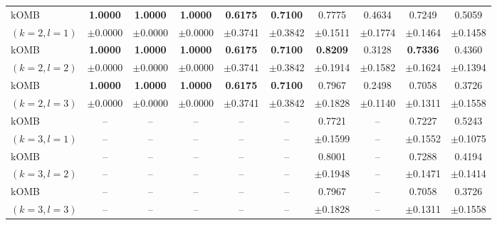 \begin{tabular}{lccccccccc}
kOMB
& \textbf{1.0000} & \textbf{1.0000} & \textbf{1.0000} & \textbf{0.6175} & \textbf{0.7100} & 0.7775 & 0.4634 & 0.7249 & 0.5059 \\
{\scriptsize $(k=2,l=1)$} & {\scriptsize $\pm$0.0000} & {\scriptsize $\pm$0.0000} & {\scriptsize $\pm$0.0000} & {\scriptsize $\pm$0.3741} & {\scriptsize $\pm$0.3842} & {\scriptsize $\pm$0.1511} & {\scriptsize $\pm$0.1774} & {\scriptsize $\pm$0.1464} & {\scriptsize $\pm$0.1458} \\

kOMB
& \textbf{1.0000} & \textbf{1.0000} & \textbf{1.0000} & \textbf{0.6175} & \textbf{0.7100} & \textbf{0.8209} & 0.3128 & \textbf{0.7336} & 0.4360 \\
{\scriptsize $(k=2,l=2)$} & {\scriptsize $\pm$0.0000} & {\scriptsize $\pm$0.0000} & {\scriptsize $\pm$0.0000} & {\scriptsize $\pm$0.3741} & {\scriptsize $\pm$0.3842} & {\scriptsize $\pm$0.1914} & {\scriptsize $\pm$0.1582} & {\scriptsize $\pm$0.1624} & {\scriptsize $\pm$0.1394} \\

kOMB
& \textbf{1.0000} & \textbf{1.0000} & \textbf{1.0000} & \textbf{0.6175} & \textbf{0.7100} & 0.7967 & 0.2498 & 0.7058 & 0.3726 \\
{\scriptsize $(k=2,l=3)$} & {\scriptsize $\pm$0.0000} & {\scriptsize $\pm$0.0000} & {\scriptsize $\pm$0.0000} & {\scriptsize $\pm$0.3741} & {\scriptsize $\pm$0.3842} & {\scriptsize $\pm$0.1828} & {\scriptsize $\pm$0.1140} & {\scriptsize $\pm$0.1311} & {\scriptsize $\pm$0.1558} \\

kOMB
& -- & -- & -- & -- & -- & 0.7721 & -- & 0.7227 & 0.5243 \\
{\scriptsize $(k=3,l=1)$} & -- & -- & -- & -- & -- & {\scriptsize $\pm$0.1599} & -- & {\scriptsize $\pm$0.1552} & {\scriptsize $\pm$0.1075} \\

kOMB
& -- & -- & -- & -- & -- & 0.8001 & -- & 0.7288 & 0.4194 \\
{\scriptsize $(k=3,l=2)$} & -- & -- & -- & -- & -- & {\scriptsize $\pm$0.1948} & -- & {\scriptsize $\pm$0.1471} & {\scriptsize $\pm$0.1414} \\

kOMB
& -- & -- & -- & -- & -- & 0.7967 & -- & 0.7058 & 0.3726 \\
{\scriptsize $(k=3,l=3)$} & -- & -- & -- & -- & -- & {\scriptsize $\pm$0.1828} & -- & {\scriptsize $\pm$0.1311} & {\scriptsize $\pm$0.1558} \\
\bottomrule
\end{tabular}
